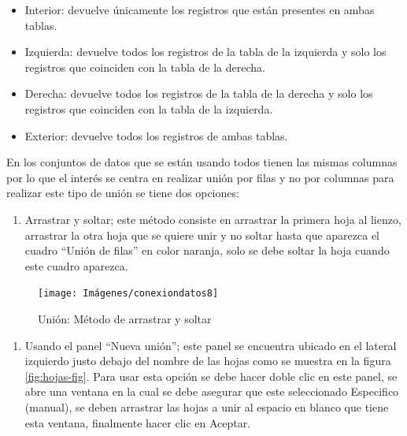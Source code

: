 \documentclass[
]{book}
\providecommand{\tightlist}{%
  \setlength{\itemsep}{0pt}\setlength{\parskip}{0pt}}
\begin{document}
\begin{itemize}
\item
  Interior: devuelve únicamente los registros que están presentes en ambas tablas.
\item
  Izquierda: devuelve todos los registros de la tabla de la izquierda y solo los registros que coinciden con la tabla de la derecha.
\item
  Derecha: devuelve todos los registros de la tabla de la derecha y solo los registros que coinciden con la tabla de la izquierda.
\item
  Exterior: devuelve todos los registros de ambas tablas.
\end{itemize}

En los conjuntos de datos que se están usando todos tienen las mismas columnas por lo que el interés se centra en realizar unión por filas y no por columnas para realizar este tipo de unión se tiene dos opciones:

\begin{enumerate}
\def\labelenumi{\arabic{enumi}.}
\tightlist
\item
  Arrastrar y soltar; este método consiste en arrastrar la primera hoja al lienzo, arrastrar la otra hoja que se quiere unir y no soltar hasta que aparezca el cuadro ``Unión de filas'' en color naranja, solo se debe soltar la hoja cuando este cuadro aparezca.
\end{enumerate}

\begin{figure}

{\centering \texttt{[image: Imágenes/conexiondatos8]} 

}

\caption{Unión: Método de arrastrar y soltar}\label{fig:unionarrastrar-fig}
\end{figure}

\begin{enumerate}
\def\labelenumi{\arabic{enumi}.}
\setcounter{enumi}{1}
\tightlist
\item
  Usando el panel ``Nueva unión''; este panel se encuentra ubicado en el lateral izquierdo justo debajo del nombre de las hojas como se muestra en la figura \ref{fig:hojas-fig}. Para usar esta opción se debe hacer doble clic en este panel, se abre una ventana en la cual se debe asegurar que este seleccionado Especifico (manual), se deben arrastrar las hojas a unir al espacio en blanco que tiene esta ventana, finalmente hacer clic en Aceptar.
\end{enumerate}
\end{document}
